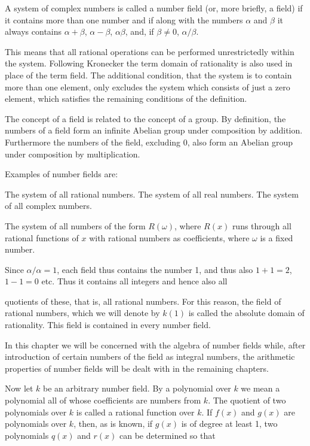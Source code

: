 A system of complex numbers is called a number field (or, more briefly, a field) if it contains more than one number and if along with the numbers $\alpha$ and $\beta$ it always contains $\alpha + \beta$, $\alpha - \beta$, $\alpha\beta$, and, if $\beta \neq 0$, $\alpha/\beta$.

This means that all rational operations can be performed unrestrictedly within the system. Following Kronecker the term domain of rationality is also used in place of the term field. The additional condition, that the system is to contain more than one element, only excludes the system which consists of just a zero element, which satisfies the remaining conditions of the definition.

The concept of a field is related to the concept of a group. By definition, the numbers of a field form an infinite Abelian group under composition by addition. Furthermore the numbers of the field, excluding 0, also form an Abelian group under composition by multiplication.

Examples of number fields are:

The system of all rational numbers.
The system of all real numbers.
The system of all complex numbers.

The system of all numbers of the form $R(\omega)$, where $R(x)$ runs through all rational functions of $x$ with rational numbers as coefficients, where $\omega$ is a fixed number.

Since $\alpha/\alpha = 1$, each field thus contains the number 1, and thus also $1 + 1 = 2$, $1 - 1 = 0$ etc. Thus it contains all integers and hence also all

quotients of these, that is, all rational numbers. For this reason, the field of rational numbers, which we will denote by $k(1)$ is called the absolute domain of rationality. This field is contained in every number field.

In this chapter we will be concerned with the algebra of number fields while, after introduction of certain numbers of the field as integral numbers, the arithmetic properties of number fields will be dealt with in the remaining chapters.

Now let $k$ be an arbitrary number field. By a polynomial over $k$ we mean a polynomial all of whose coefficients are numbers from $k$. The quotient of two polynomials over $k$ is called a rational function over $k$. If $f(x)$ and $g(x)$ are polynomials over $k$, then, as is known, if $g(x)$ is of degree at least 1, two polynomials $q(x)$ and $r(x)$ can be determined so that


